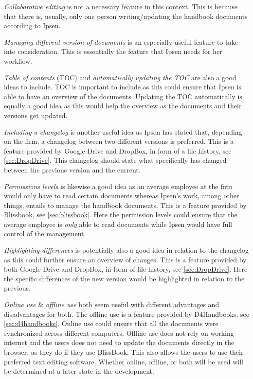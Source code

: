\textit{Collaborative editing} is not a necessary feature in this context.
This is because that there is, usually, only one person writing/updating the handbook documents according to Ipsen.

\textit{Managing different version of documents} is an especially useful feature to take into consideration.
This is essentially the feature that Ipsen needs for her workflow.

\textit{Table of contents} (TOC) and \textit{automatically updating the TOC} are also a good ideas to include.
TOC is important to include as this could ensure that Ipsen is able to have an overview of the documents.
Updating the TOC automatically is equally a good idea as this would help the overview as the documents and their versions get updated.

\textit{Including a changelog} is another useful idea as Ipsen has stated that, depending on the firm, a changelog between two different versions is preferred.
This is a feature provided by Google Drive and DropBox, in form of a file history, see \cref{sec:DropDrive}.
This changelog should state what specifically has changed between the previous version and the current.

\textit{Permissions levels} is likewise a good idea as an average employee at the firm would only have to read certain documents whereas Ipsen's work, among other things, entails to manage the handbook documents.
This is a feature provided by Blissbook, see \cref{sec:blissbook}.
Here the permission levels could ensure that the average employee is \textit{only} able to read documents while Ipsen would have full control of the management.

\textit{Highlighting differences} is potentially also a good idea in relation to the changelog as this could further ensure an overview of changes.
This is a feature provided by both Google Drive and DropBox, in form of file history, see \cref{sec:DropDrive}.
Here the specific differences of the new version would be highlighted in relation to the previous.

\textit{Online use} \& \textit{offline use} both seem useful with different advantages and disadvantages for both.
The offline use is a feature provided by D4Handbooks, see \cref{sec:d4handbooks}.
Online use could ensure that all the documents were synchronized across different computers.
Offline use does not rely on working internet and the users does not need to update the documents directly in the browser, as they do if they use BlissBook.
This also allows the users to use their preferred text editing software.
Whether online, offline, or both will be used will be determined at a later state in the development.


